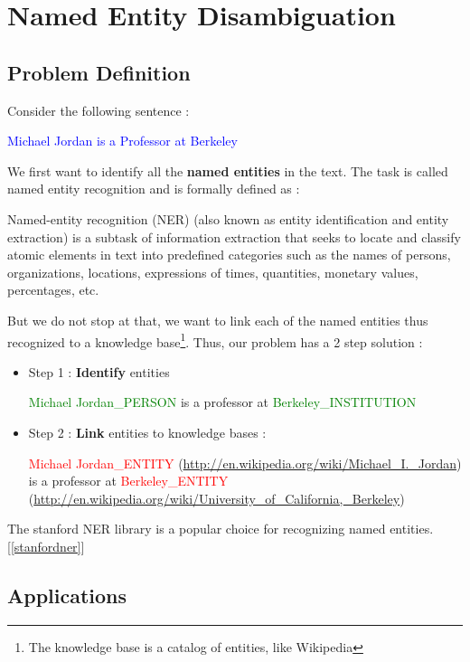 \section{Named Entity Disambiguation}
\subsection{Problem Definition}
Consider the following sentence : 

 \begin{center}
\textcolor{blue}{Michael Jordan is a Professor at Berkeley}
   \end{center}

 We first want to identify all the \textbf{named entities} in the text. The task is called named entity recognition and is 
 formally defined as : 
 \begin{mydef}
 \label{nerdef}
   Named-entity recognition (NER) (also known as entity identification and entity extraction) is a subtask of information extraction that seeks to locate and classify 
   atomic elements in text into predefined categories such as the names of persons, organizations, locations, expressions of times, quantities, monetary values, percentages, etc.
  \end{mydef}
 But we do not stop at that, we want to link each of the named entities thus recognized to a knowledge base\footnote{The knowledge base is a catalog of entities, like Wikipedia}.
 Thus, our problem has a 2 step solution : 

 \begin{itemize}  
  \item Step 1 : \textbf{Identify} entities
  \medskip
  
  \textcolor{green}{Michael Jordan\_PERSON} is a professor at \textcolor{green}{Berkeley\_INSTITUTION} \medskip
  \item Step 2 : \textbf{Link} entities to knowledge bases : 
  \medskip
  
  \textcolor{red}{Michael Jordan\_ENTITY} (\url{http://en.wikipedia.org/wiki/Michael_I._Jordan})  is a professor at  
  \textcolor{red}{Berkeley\_ENTITY} (\url{http://en.wikipedia.org/wiki/University_of_California,_Berkeley})
\end{itemize}

The stanford NER library is a popular choice for recognizing named entities. [\ref{stanfordner}]

\subsection{Applications}



